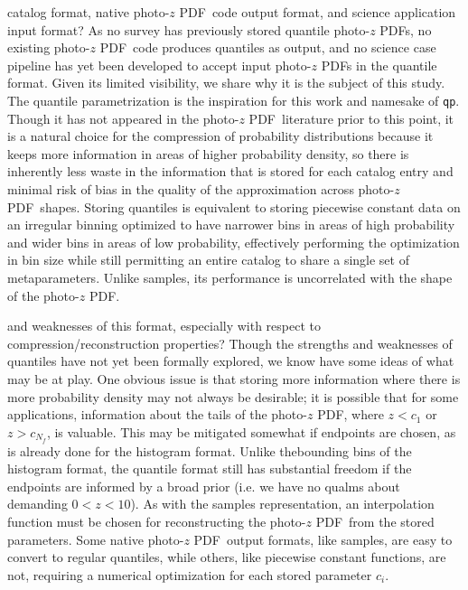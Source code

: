 \documentclass[\docopts]{\docclass}
\newcommand{\qp}{\texttt{qp}}
\newcommand{\pz}{photo-$z$ PDF}
\begin{document}
catalog format, native \pz\ code output format, and science application input 
format?
As no survey has previously stored quantile \pz s, no existing \pz\ code 
produces quantiles as output, and no science case pipeline has yet been 
developed to accept input \pz s in the quantile format.  Given its limited 
visibility, we share why it is the subject of this study.  The quantile 
parametrization is the inspiration for this work and namesake of \qp.  Though 
it has not appeared in the \pz\ literature prior to this point, it is a natural 
choice for the compression of probability distributions because it keeps more 
information in areas of higher probability density, so there is inherently less 
waste in the information that is stored for each catalog entry and minimal risk 
of bias in the quality of the approximation across \pz\ shapes.  Storing 
quantiles is equivalent to storing piecewise constant data on an irregular 
binning optimized to have narrower bins in areas of high probability and wider 
bins in areas of low probability, effectively performing the optimization in 
bin size while still permitting an entire catalog to share a single set of 
metaparameters.  Unlike samples, its performance is uncorrelated with the shape 
of the \pz.

and weaknesses of this format, especially with respect to 
compression/reconstruction properties?
Though the strengths and weaknesses of quantiles have not yet been formally 
explored, we know have some ideas of what may be at play.  One obvious issue is 
that storing more information where there is more probability density may not 
always be desirable; it is possible that for some applications, information 
about the tails of the \pz, where $z<c_{1}$ or $z>c_{N_{f}}$, is valuable.  
This may be mitigated somewhat if endpoints are chosen, as is already done for 
the histogram format.  Unlike thebounding bins of the histogram format, the 
quantile format still has substantial freedom if the endpoints are informed by 
a broad prior (i.e. we have no qualms about demanding $0<z<10$).  As with the 
samples representation, an interpolation function must be chosen for 
reconstructing the \pz\ from the stored parameters.  Some native \pz\ output 
formats, like samples, are easy to convert to regular quantiles, while others, 
like piecewise constant functions, are not, requiring a numerical optimization 
for each stored parameter $c_{i}$.
\end{document}

